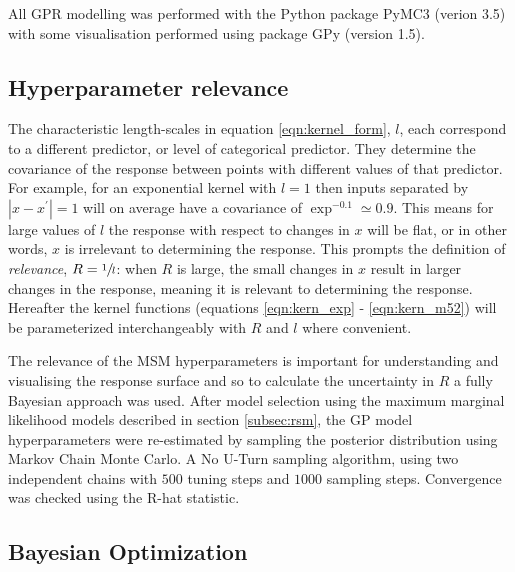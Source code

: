 All GPR modelling was performed with the Python package PyMC3 (verion 3.5)\cite{salvatierProbabilisticProgrammingPython2016} with some visualisation performed using package GPy (version 1.5)\cite{gpy2014}. 

\subsection{Hyperparameter relevance}\label{sub:msm_meth_rel}
The characteristic length-scales in equation \ref{eqn:kernel_form}, $l$, each correspond to a different predictor, or level of categorical predictor. They determine the covariance of the response between points with different values of that predictor. For example, for an exponential kernel with $l=1$ then inputs separated by $|x-x^{\prime}|= 1$ will on average have a covariance of $\exp^{-0.1}\simeq 0.9$. This means for large values of $l$ the response with respect to changes in $x$ will be flat, or in other words, $x$ is irrelevant to determining the response. This prompts the definition of \emph{relevance}, $R = \sfrac{1}{l}$\cite{bernardo1998regression,bergstrajamesbergstraRandomSearchHyperParameter2012}: when $R$ is large, the small changes in $x$ result in larger changes in the response, meaning it is relevant to determining the response. Hereafter the kernel functions (equations \ref{eqn:kern_exp} - \ref{eqn:kern_m52}) will be parameterized interchangeably with $R$ and $l$ where convenient.  

The relevance of the MSM hyperparameters is important for understanding and visualising the response surface and so to calculate the uncertainty in $R$ a fully Bayesian approach was used. After model selection using the maximum marginal likelihood models described in section \ref{subsec:rsm}, the GP model hyperparameters were re-estimated by sampling the posterior distribution using Markov Chain Monte Carlo. A No U-Turn sampling algorithm, using two independent chains with $500$ tuning steps and $1000$ sampling steps. Convergence was checked using the R-hat statistic\cite{vehtariRanknormalizationFoldingLocalization2020}. 

\subsection{Bayesian Optimization}\label{subsec:bayes_opt}

